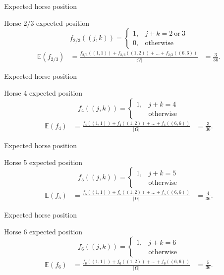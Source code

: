 \documentclass{beamer}
\begin{document}
\begin{frame}{Expected horse position}
  \begin{block}{Horse $2/3$ expected position}
    $$f_{2/3}((j,k)) = \left\lbrace\begin{array}{cc}1, & j+k=2\ \text{or}\ 3\\0, & \text{otherwise}\end{array}\right.$$
    \begin{align*}
      \mathbb{E}(f_{2/3})
        & = \frac{f_{2/3}((1,1))+f_{2/3}((1,2))+\dots+f_{2/3}((6,6))}{|\Omega|}
        & = \frac{3}{36}.
    \end{align*}
  \end{block}
\end{frame}

\begin{frame}{Expected horse position}
  \begin{block}{Horse 4 expected position}
    $$f_{4}((j,k)) = \left\lbrace\begin{array}{cc}1, & j+k=4\\ & \text{otherwise}\end{array}\right.$$
    \begin{align*}
      \mathbb{E}(f_{4})
        & = \frac{f_{4}((1,1))+f_{4}((1,2))+\dots+f_{4}((6,6))}{|\Omega|}
        & = \frac{3}{36}.
    \end{align*}
  \end{block}
\end{frame}

\begin{frame}{Expected horse position}
  \begin{block}{Horse 5 expected position}
    $$f_{5}((j,k)) = \left\lbrace\begin{array}{cc}1, & j+k=5\\ & \text{otherwise}\end{array}\right.$$
    \begin{align*}
      \mathbb{E}(f_{5})
        & = \frac{f_{5}((1,1))+f_{5}((1,2))+\dots+f_{5}((6,6))}{|\Omega|}
        & = \frac{4}{36}.
    \end{align*}
  \end{block}
\end{frame}

\begin{frame}{Expected horse position}
  \begin{block}{Horse 6 expected position}
    $$f_{6}((j,k)) = \left\lbrace\begin{array}{cc}1, & j+k=6\\ & \text{otherwise}\end{array}\right.$$
    \begin{align*}
      \mathbb{E}(f_{6})
        & = \frac{f_{6}((1,1))+f_{6}((1,2))+\dots+f_{6}((6,6))}{|\Omega|}
        & = \frac{5}{36}.
    \end{align*}
  \end{block}
\end{frame}
\end{document}
